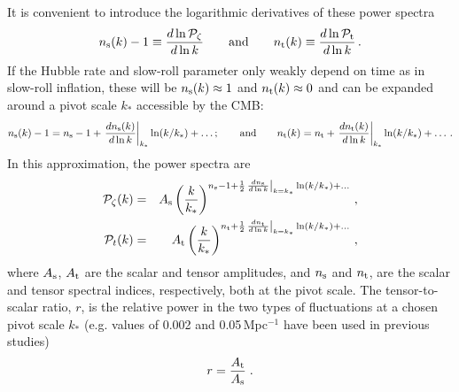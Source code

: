It is convenient to introduce the logarithmic derivatives of these power spectra 
\begin{equation}\label{eq:specind}
n_{\rm s}(k)-1\equiv\frac{d\ln \mathcal{P}_{\zeta}}{d\ln k}\qquad{\rm and}\qquad n_{\rm t}(k)\equiv \frac{d\ln \mathcal{P}_{\rm t}}{d\ln k}\,.
\end{equation}
If the Hubble rate and slow-roll parameter only weakly depend on time as in slow-roll inflation, these will be $n_{\rm s}(k)\approx 1$ and $n_{\rm t}(k)\approx 0$ and can be expanded around a pivot scale $k_\ast$ accessible by the CMB:
\begin{equation}
n_{\rm s}(k)-1=n_{\rm s}-1+\left.\frac{dn_{\rm s}(k)}{d\ln k}\right|_{k_\ast}\ln(k/k_\ast)+\dots; \qquad{\rm and}\qquad n_{\rm t}(k)=n_{\rm t}+\left.\frac{dn_{\rm t}(k)}{d\ln k}\right|_{k_\ast}\ln(k/k_\ast)+\dots \,.
\end{equation}
In this approximation, the power spectra are
\begin{eqnarray}\label{eq:power_spectra_power_law}
\mathcal{P}_{\zeta}(k)&=& A_{\rm s}\left(\frac{k}{k_\ast}\right)^{n_{\rm s}-1+\frac{1}{2}\left.\frac{dn_{\rm s}}{d\ln k}\right|_{k=k_\ast}\ln(k/k_\ast)+\dots}\,,\nonumber\\
\mathcal{P}_{t}(k)&=& A_{\rm t} \left(\frac{k}{k_\ast}\right)^{n_{\rm t}+\frac{1}{2}\left.\frac{dn_{\rm t}}{d\ln k}\right|_{k=k_\ast}\ln(k/k_\ast)+\dots}\,,
\end{eqnarray}
where $A_{\rm s}$, $A_{\rm t}$ are the scalar and tensor amplitudes, and $n_{\rm s}$ and $n_{\rm t}$, are the scalar and tensor spectral indices, respectively, both at the pivot scale. 
The tensor-to-scalar ratio, $r$, is the relative power in the two types of fluctuations at a chosen pivot scale $k_\ast$ (e.g. values of 0.002 and
0.05\,Mpc$^{-1}$ have been used in previous studies)
\begin{equation}
r=\frac{A_{\rm t}}{A_{\rm s}}\;.
\end{equation}

